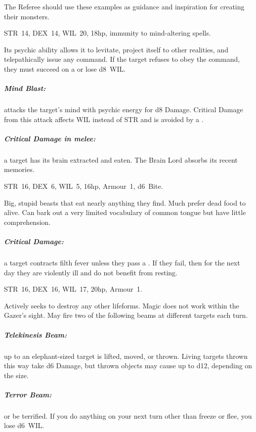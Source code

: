 \documentclass[itdr]{subfiles}
\begin{document}
\label{ch:appendix_b}

The Referee should use these examples as guidance and inspiration for creating their monsters.

\vfill

STR~14, DEX~14, WIL~20, 18hp, immunity to mind-altering spells.

Its psychic ability allows it to levitate, project itself to other realities, and telepathically issue any command. If the target refuses to obey the command, they must succeed on a  or lose d8~WIL.

\subparagraph{Mind Blast:} attacks the target's mind with psychic energy for d8 Damage. Critical Damage from this attack affects WIL instead of STR and is avoided by a .

\subparagraph{Critical Damage in melee:} a target has its brain extracted and eaten. The Brain Lord absorbs its recent memories.

\vfill


\vspace{-2ex}

STR~16, DEX~6, WIL~5, 16hp, Armour~1, d6~Bite.

Big, stupid beasts that eat nearly anything they find. Much prefer dead food to alive. Can bark out a very limited vocabulary of common tongue but have little comprehension.

\subparagraph{Critical Damage:} a target contracts filth fever unless they pass a . If they fail, then for the next day they are violently ill and do not benefit from resting.

\vfill

STR~16, DEX~16, WIL~17, 20hp, Armour~1.

Actively seeks to destroy any other lifeforms. Magic does not work within the Gazer's sight. May fire two of the following beams at different targets
each turn.

\subparagraph{Telekinesis Beam:} up to an elephant-sized target is lifted, moved, or thrown. Living targets thrown this way take d6 Damage, but thrown objects may cause up to d12, depending on the size.

\subparagraph{Terror Beam:}  or be terrified. If you do anything on your next turn other than freeze or flee, you lose d6~WIL.
\end{document}
